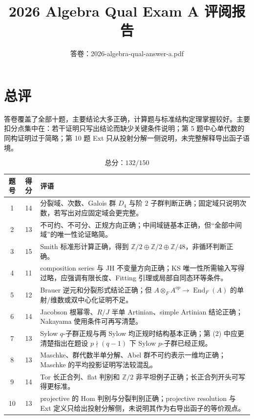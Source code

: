 \documentclass[11pt]{article}
\title{\textbf{2026 Algebra Qual Exam A 评阅报告}}
\author{答卷：2026-algebra-qual-answer-a.pdf}
\date{}
\begin{document}
\maketitle

\section*{总评}

答卷覆盖了全部十题，主要结论大多正确，计算题与标准结构定理掌握较好。主要扣分点集中在：若干证明只写出结论而缺少关键条件说明；第 5 题中心单代数的同构证明过于简略；第 10 题 Ext 只从投射分解一侧说明，未完整解释导出函子语境。

\[
\boxed{\text{总分：}132/150}
\]

\begin{center}
\begin{tabular}{c c p{9.5cm}}
\toprule
题号 & 得分 & 评语 \\
\midrule
1 & 14 & 分裂域、次数、Galois 群 \(D_4\) 与阶 \(2\) 子群判断正确；固定域只说明次数，若写出对应固定域会更完整。\\
2 & 13 & 不可约、不可分、正规方向正确；中间域链基本正确，但“全部中间域”的唯一性论证略简。\\
3 & 15 & Smith 标准形计算正确，得到 \(\mathbb Z/2\oplus\mathbb Z/2\oplus\mathbb Z/48\)，非循环判断正确。\\
4 & 11 & composition series 与 JH 不变量方向正确；KS 唯一性所需输入写得过略，应强调有限长度、Fitting 引理或局部自同态环等条件。\\
5 & 12 & Brauer 逆元和分裂形式结论正确；但 \(A\otimes_F A^{op}\to \operatorname{End}_F(A)\) 的单射/维数或双中心化证明不足。\\
6 & 14 & Jacobson 根幂零、\(R/J\) 半单 Artinian、simple Artinian 结论正确；Nakayama 使用条件可再写清楚。\\
7 & 13 & Sylow \(q\)-子群正规与两 Sylow 均正规时结构基本正确；第 (2) 中应更清楚指出在题设 \(p\nmid(q-1)\) 下 Sylow \(p\)-子群已经正规。\\
8 & 13 & Maschke、群代数半单分解、Abel 群不可约表示一维均正确；Maschke 的平均投影证明写法较混乱。\\
9 & 14 & Tor 长正合列、flat 判别和 \(\mathbb Z/2\) 非平坦例子正确；长正合列开头可写得更标准。\\
10 & 13 & projective 的 Hom 判别与分裂判别正确；projective resolution 与 Ext 定义只给出投射分解侧，未说明其作为右导出函子的等价观点。\\
\bottomrule
\end{tabular}
\end{center}
\end{document}
